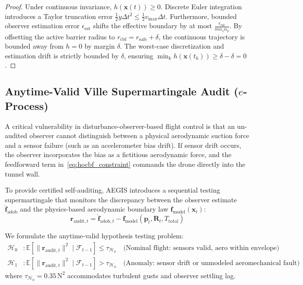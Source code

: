 \documentclass[11pt,a4paper]{article}
\begin{document}
\begin{proof}
Under continuous invariance, $h(\mathbf{x}(t)) \ge 0$. Discrete Euler integration introduces a Taylor truncation error $\frac{1}{2} \ddot{y} \Delta t^2 \le \frac{1}{2} v_{\max} \Delta t$. Furthermore, bounded observer estimation error $\epsilon_{\text{est}}$ shifts the effective boundary by at most $\frac{\epsilon_{\text{est}}}{m \alpha_1 \alpha_2}$. By offsetting the active barrier radius to $r_{\text{cbf}} = r_{\text{safe}} + \delta$, the continuous trajectory is bounded away from $h = 0$ by margin $\delta$. The worst-case discretization and estimation drift is strictly bounded by $\delta$, ensuring $\min_k h(\mathbf{x}(t_k)) \ge \delta - \delta = 0$.
\end{proof}

\subsection{Anytime-Valid Ville Supermartingale Audit ($e$-Process)}
A critical vulnerability in disturbance-observer-based flight control is that an un-audited observer cannot distinguish between a physical aerodynamic suction force and a sensor failure (such as an accelerometer bias drift). If sensor drift occurs, the observer incorporates the bias as a fictitious aerodynamic force, and the feedforward term in~\eqref{eq:hocbf_constraint} commands the drone directly into the tunnel wall.

To provide certified self-auditing, AEGIS introduces a sequential testing supermartingale that monitors the discrepancy between the observer estimate $\hat{\mathbf{f}}_{\text{adob}}$ and the physics-based aerodynamic boundary law $\mathbf{f}_{\text{model}}(\mathbf{x}_t)$:
\begin{equation}
\mathbf{r}_{\text{audit}, t} = \hat{\mathbf{f}}_{\text{adob}, t} - \mathbf{f}_{\text{model}}(\mathbf{p}_t, \mathbf{R}_t, T_{\text{total}})
\label{eq:audit_residual}
\end{equation}

\noindent We formulate the anytime-valid hypothesis testing problem:
\begin{align}
\mathcal{H}_0 &: \mathbb{E}\left[\|\mathbf{r}_{\text{audit}, t}\|^2 \mid \mathcal{F}_{t-1}\right] \le \tau_{\mathcal{H}_0} \quad \text{(Nominal flight: sensors valid, aero within envelope)} \\
\mathcal{H}_1 &: \mathbb{E}\left[\|\mathbf{r}_{\text{audit}, t}\|^2 \mid \mathcal{F}_{t-1}\right] > \tau_{\mathcal{H}_0} \quad \text{(Anomaly: sensor drift or unmodeled aeromechanical fault)}
\end{align}
where $\tau_{\mathcal{H}_0} = 0.35\,\text{N}^2$ accommodates turbulent gusts and observer settling lag.
\end{document}
